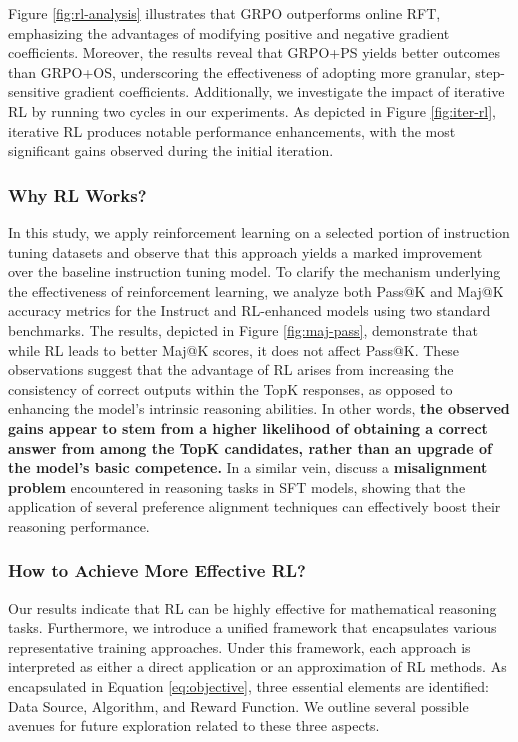 \begin{itemize}[topsep=0pt]
\begin{itemize}[topsep=0pt]
Figure \ref{fig:rl-analysis} illustrates that GRPO outperforms online RFT, emphasizing the advantages of modifying positive and negative gradient coefficients. Moreover, the results reveal that GRPO+PS yields better outcomes than GRPO+OS, underscoring the effectiveness of adopting more granular, step-sensitive gradient coefficients. Additionally, we investigate the impact of iterative RL by running two cycles in our experiments. As depicted in Figure \ref{fig:iter-rl}, iterative RL produces notable performance enhancements, with the most significant gains observed during the initial iteration.

\subsubsection{Why RL Works?} In this study, we apply reinforcement learning on a selected portion of instruction tuning datasets and observe that this approach yields a marked improvement over the baseline instruction tuning model. To clarify the mechanism underlying the effectiveness of reinforcement learning, we analyze both Pass@K and Maj@K accuracy metrics for the Instruct and RL-enhanced models using two standard benchmarks. The results, depicted in Figure \ref{fig:maj-pass}, demonstrate that while RL leads to better Maj@K scores, it does not affect Pass@K. These observations suggest that the advantage of RL arises from increasing the consistency of correct outputs within the TopK responses, as opposed to enhancing the model’s intrinsic reasoning abilities. In other words, \textbf{the observed gains appear to stem from a higher likelihood of obtaining a correct answer from among the TopK candidates, rather than an upgrade of the model's basic competence.} In a similar vein, \citep{wang2023making} discuss a \textbf{misalignment problem} encountered in reasoning tasks in SFT models, showing that the application of several preference alignment techniques \citep{yuan2023rrhf,song2023preference,wang2023making} can effectively boost their reasoning performance.

\subsubsection{How to Achieve More Effective RL?}
\label{sec:effec_rl}
Our results indicate that RL can be highly effective for mathematical reasoning tasks. Furthermore, we introduce a unified framework that encapsulates various representative training approaches. Under this framework, each approach is interpreted as either a direct application or an approximation of RL methods. As encapsulated in Equation \ref{eq:objective}, three essential elements are identified: Data Source, Algorithm, and Reward Function. We outline several possible avenues for future exploration related to these three aspects.


\end{itemize}
\end{itemize}
